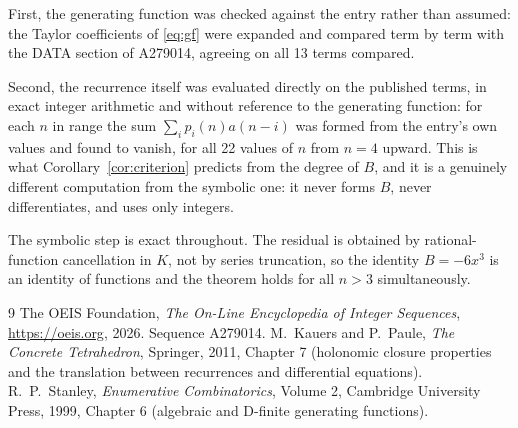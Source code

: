 \documentclass[11pt,a4paper]{article}
\theoremstyle{plain}
\theoremstyle{definition}
\begin{document}
First, the generating function was checked against the entry rather than assumed: the
Taylor coefficients of \eqref{eq:gf} were expanded and compared term by term with the DATA
section of A279014, agreeing on all 13 terms compared.

Second, the recurrence itself was evaluated directly on the published terms, in exact
integer arithmetic and without reference to the generating function: for each $n$ in range
the sum $\sum_{i}p_{i}(n)a(n-i)$ was formed from the entry's own values and found to
vanish, for all 22 values of $n$ from $n=4$ upward. This is what
Corollary~\ref{cor:criterion} predicts from the degree of $B$, and it is a genuinely
different computation from the symbolic one: it never forms $B$, never differentiates, and
uses only integers.

The symbolic step is exact throughout. The residual is obtained by rational-function
cancellation in $K$, not by series truncation, so the identity $B=- 6 x^{3}$ is an
identity of functions and the theorem holds for all $n>3$ simultaneously.

\begin{thebibliography}{9}
 The OEIS Foundation, \emph{The On-Line Encyclopedia of Integer Sequences},
\url{https://oeis.org}, 2026. Sequence A279014.
 M.~Kauers and P.~Paule, \emph{The Concrete Tetrahedron}, Springer, 2011,
Chapter 7 (holonomic closure properties and the translation between recurrences and
differential equations).
 R.~P.~Stanley, \emph{Enumerative Combinatorics}, Volume 2, Cambridge
University Press, 1999, Chapter 6 (algebraic and D-finite generating functions).
\end{thebibliography}
\end{document}

